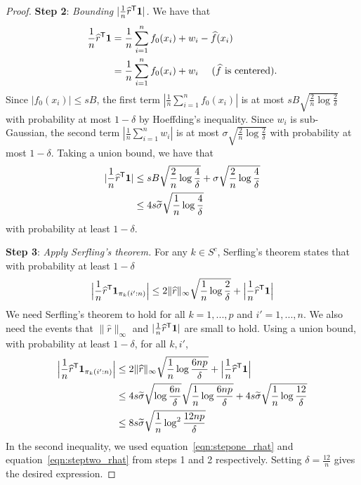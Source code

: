 \begin{proof}
\vskip5pt
\textbf{Step 2}: {\it Bounding $| \frac{1}{n} \widehat{r}^{\mathsf{T}} \mbox{\boldmath $1$}
  |$.}  We have that 
\begin{align*}
\frac{1}{n} \widehat{r}^{\mathsf{T}} \mbox{\boldmath $1$} &= 
    \frac{1}{n} \sum_{i=1}^n f_0(x_i) + w_i - \widehat{f}(x_i) \\
  &= \frac{1}{n} \sum_{i=1}^n f_0(x_i) + w_i \quad \textrm{ ($\widehat{f}$ is centered)}.
\end{align*}
Since $|f_0(x_i)| \leq sB$, the first term $| \frac{1}{n} \sum_{i=1}^n
f_0(x_i)|$ is at most $sB \sqrt{\frac{2}{n} \log \frac{2}{\delta}}$
with probability at most $1-\delta$ by Hoeffding's inequality. Since
$w_i$ is sub-Gaussian, the second term $|\frac{1}{n} \sum_{i=1}^n
w_i|$ is at most $\sigma \sqrt{ \frac{2}{n} \log \frac{2}{\delta}}$
with probability at most $1-\delta$.  
Taking a union bound, we have that 
\begin{align}
| \frac{1}{n} \widehat{r}^{\mathsf{T}} \mbox{\boldmath $1$}| &\leq sB \sqrt{\frac{2}{n} \log \frac{4}{\delta}} +  \sigma \sqrt{\frac{2}{n} \log \frac{4}{\delta}} \nonumber \\
  &\leq 4 s \widetilde{\sigma} \sqrt{\frac{1}{n} \log \frac{4}{\delta}} \label{eqn:steptwo_rhat}
\end{align}
with probability at least $1-\delta$.

\vskip5pt
\textbf{Step 3}: {\it Apply Serfling's theorem.}  
For any $k \in S^c$, Serfling's theorem states that with probability at least $1 - \delta$
\begin{align*}
\Big
|\frac{1}{n} \widehat{r}^{\mathsf{T}} \mbox{\boldmath $1$}_{\pi_k(i':n)}\Big| \leq
   2\| \widehat{r} \|_\infty \sqrt{ \frac{1}{n} \log \frac{2}{\delta}} + 
   \Big|\frac{1}{n} \widehat{r}^{\mathsf{T}} \mbox{\boldmath $1$} \Big|
\end{align*}
We need Serfling's theorem to hold for all $k = 1,...,p$ and $i' =
1,...,n$. We also need the events that $\|\hat{r}\|_\infty$ and $|
\frac{1}{n} \widehat{r}^{\mathsf{T}} \mbox{\boldmath $1$}|$ are small to hold. Using a
union bound, with probability at least $1-\delta$, for all $k,i'$,
\begin{align*}
\Big
|\frac{1}{n} \widehat{r}^{\mathsf{T}} \mbox{\boldmath $1$}_{\pi_k(i':n)}\Big| &\leq
   2\| \widehat{r} \|_\infty \sqrt{ \frac{1}{n} \log \frac{6np}{\delta}} + 
   \Big|\frac{1}{n} \widehat{r}^{\mathsf{T}} \mbox{\boldmath $1$} \Big|\\
  &\leq 4s\widetilde{\sigma}\sqrt{\log \frac{6n}{\delta}} \sqrt{\frac{1}{n}\log \frac{6np}{\delta}} + 4 s \widetilde{\sigma} \sqrt{\frac{1}{n}\log \frac{12}{\delta}} \\
  &\leq 8 s\widetilde{\sigma} \sqrt{ \frac{1}{n} \log^2 \frac{12np}{\delta}}
\end{align*}
In the second inequality, we used equation~\eqref{eqn:stepone_rhat}
and equation~\eqref{eqn:steptwo_rhat} from steps 1 and 2
respectively. Setting $\delta = \frac{12}{n}$ gives the desired expression.


\end{proof}
